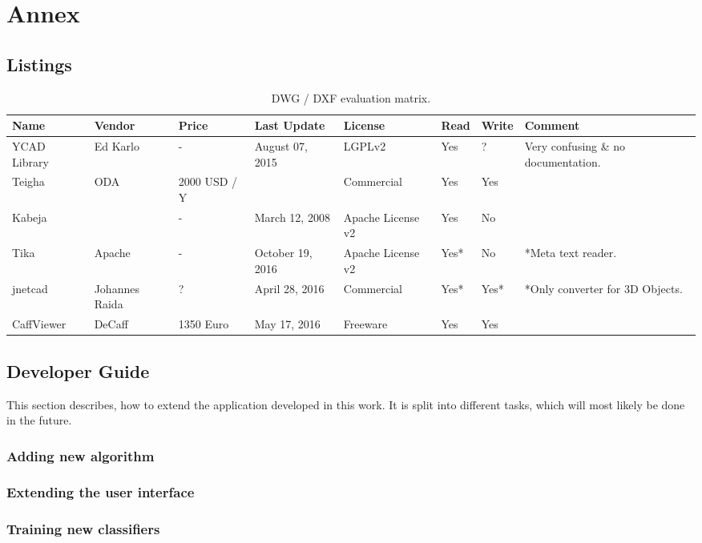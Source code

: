 \section{Annex}

\subsection{Listings}
\begin{table}[h]
\centering
\caption{DWG / DXF evaluation matrix.}
\label{tbl:DWGEvaluationMatrix}
\begin{tabular}{@{}llllllll@{}}
\toprule
Name         & Vendor         & Price        & Last Update      & License           & Read & Write & Comment                             \\ \midrule
YCAD Library & Ed Karlo       & -            & August 07, 2015  & LGPLv2            & Yes  & ?     & Very confusing \& no documentation. \\
Teigha       & ODA            & 2000 USD / Y &                  & Commercial        & Yes  & Yes   &                                     \\
Kabeja       &                & -            & March 12, 2008   & Apache License v2 & Yes  & No    &                                     \\
Tika         & Apache         & -            & October 19, 2016 & Apache License v2 & Yes* & No    & *Meta text reader.                  \\
jnetcad      & Johannes Raida & ?            & April 28, 2016   & Commercial        & Yes* & Yes*  & *Only converter for 3D Objects.     \\
CaffViewer   & DeCaff         & 1350 Euro    & May 17, 2016     & Freeware          & Yes  & Yes   &                                     \\ \bottomrule
\end{tabular}
\end{table}

\pagebreak
\subsection{Developer Guide}
This section describes, how to extend the application developed in this work. It is split into different tasks, which will most likely be done in the future.

\subsubsection{Adding new algorithm}
\subsubsection{Extending the user interface}
\subsubsection{Training new classifiers}